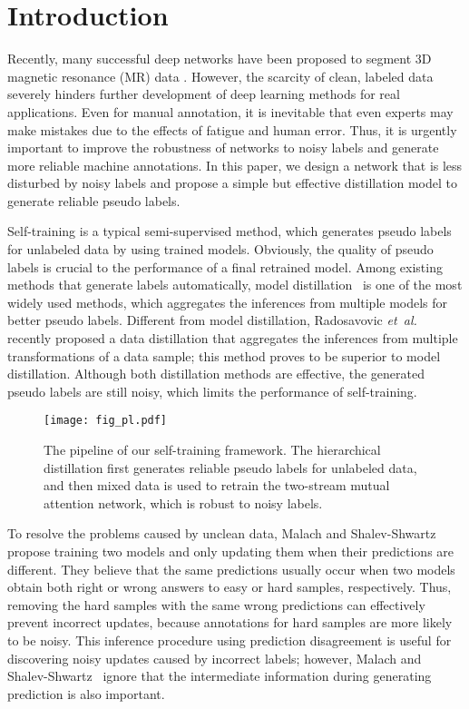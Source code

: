 \documentclass[letterpaper]{article} %
\begin{document}
\section{Introduction}\label{sec:intro}
Recently, many successful deep networks have been proposed to segment 3D magnetic resonance (MR) data \cite{Yu2017,Tseng_2017_CVPR,Cicek2016,Yu2017,Yu2017a}.
However, the scarcity of clean, labeled data severely hinders further development of deep learning methods for real applications.
Even for manual annotation, it is inevitable that even experts may make mistakes due to the effects of fatigue and human error.
Thus, it is urgently important to improve the robustness of networks to noisy labels and generate more reliable machine annotations.
In this paper, we design a network that is less disturbed by noisy labels and propose a simple but effective distillation model to generate reliable pseudo labels.

Self-training is a typical semi-supervised method, which generates pseudo labels for unlabeled data by using trained models.
Obviously, the quality of pseudo labels is crucial to the performance of a final retrained model.
Among existing methods that generate labels automatically, model distillation~\cite{Hansen1990,Gupta2016} is one of the most widely used methods, which aggregates the inferences from multiple models for better pseudo labels.
Different from model distillation, Radosavovic \emph{et~al.} recently proposed a data distillation that aggregates the inferences from multiple transformations of a data sample; this method proves to be superior to model distillation.
Although both distillation methods are effective, the generated pseudo labels are still noisy, which limits the performance of self-training.

\begin{figure}[t]
	\begin{center}
		\texttt{[image: fig\_pl.pdf]}
	\end{center}
	\caption{The pipeline of our self-training framework. The hierarchical distillation first generates reliable pseudo labels for unlabeled data, and then mixed data is used to retrain the two-stream mutual attention network, which is robust to noisy labels. }
	\label{fig:pl}
\end{figure}

To resolve the problems caused by unclean data, Malach and Shalev-Shwartz~ propose training two models and only updating them when their predictions are different.
They believe that the same predictions usually occur when two models obtain both right or wrong answers to easy or hard samples, respectively.
Thus, removing the hard samples with the same wrong predictions can effectively prevent incorrect updates, because annotations for hard samples are more likely to be noisy.
This inference procedure using prediction disagreement is useful for discovering noisy updates caused by incorrect labels; however, Malach and Shalev-Shwartz~ ignore that the intermediate information during generating prediction is also important.
\end{document}
